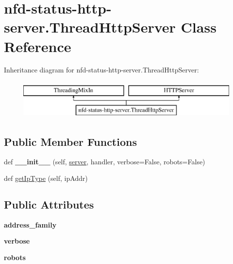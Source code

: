 \hypertarget{classnfd-status-http-server_1_1ThreadHttpServer}{}\section{nfd-\/status-\/http-\/server.Thread\+Http\+Server Class Reference}
\label{classnfd-status-http-server_1_1ThreadHttpServer}
Inheritance diagram for nfd-\/status-\/http-\/server.Thread\+Http\+Server\+:\begin{figure}[H]
\begin{center}
\leavevmode
\includegraphics[height=2.000000cm]{classnfd-status-http-server_1_1ThreadHttpServer}
\end{center}
\end{figure}
\subsection*{Public Member Functions}
\begin{DoxyCompactItemize}
\item 
def {\bfseries \+\_\+\+\_\+init\+\_\+\+\_\+} (self, \hyperlink{classwebsocketpp_1_1server}{server}, handler, verbose=False, robots=False)\hypertarget{classnfd-status-http-server_1_1ThreadHttpServer_aeeba99acb32e380dc337a50268934a62}{}\label{classnfd-status-http-server_1_1ThreadHttpServer_aeeba99acb32e380dc337a50268934a62}

\item 
def \hyperlink{classnfd-status-http-server_1_1ThreadHttpServer_a99c3bb796c3f014c69dfc2cfc9db9e10}{get\+Ip\+Type} (self, ip\+Addr)
\end{DoxyCompactItemize}
\subsection*{Public Attributes}
\begin{DoxyCompactItemize}
\item 
{\bfseries address\+\_\+family}\hypertarget{classnfd-status-http-server_1_1ThreadHttpServer_aace0f104f27e109e2cbd62e18b5a0518}{}\label{classnfd-status-http-server_1_1ThreadHttpServer_aace0f104f27e109e2cbd62e18b5a0518}

\item 
{\bfseries verbose}\hypertarget{classnfd-status-http-server_1_1ThreadHttpServer_af52b7f8cefe6d28bc58afaee3ddabec5}{}\label{classnfd-status-http-server_1_1ThreadHttpServer_af52b7f8cefe6d28bc58afaee3ddabec5}

\item 
{\bfseries robots}\hypertarget{classnfd-status-http-server_1_1ThreadHttpServer_af7c613caaa58e98e855178d3e2997cc4}{}\label{classnfd-status-http-server_1_1ThreadHttpServer_af7c613caaa58e98e855178d3e2997cc4}

\end{DoxyCompactItemize}


